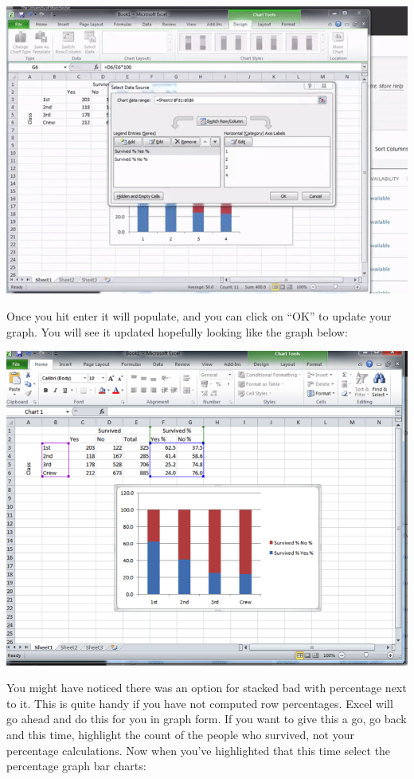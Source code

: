 \documentclass[
]{book}
\begin{document}
\includegraphics{imgs/add_labels.gif}

Once you hit enter it will populate, and you can click on ``OK'' to update your graph. You will see it updated hopefully looking like the graph below:

\includegraphics{imgs/stacked_col_5.png}

You might have noticed there was an option for stacked bad with percentage next to it. This is quite handy if you have not computed row percentages. Excel will go ahead and do this for you in graph form. If you want to give this a go, go back and this time, highlight the count of the people who survived, not your percentage calculations. Now when you've highlighted that this time select the percentage graph bar charts:
\end{document}
